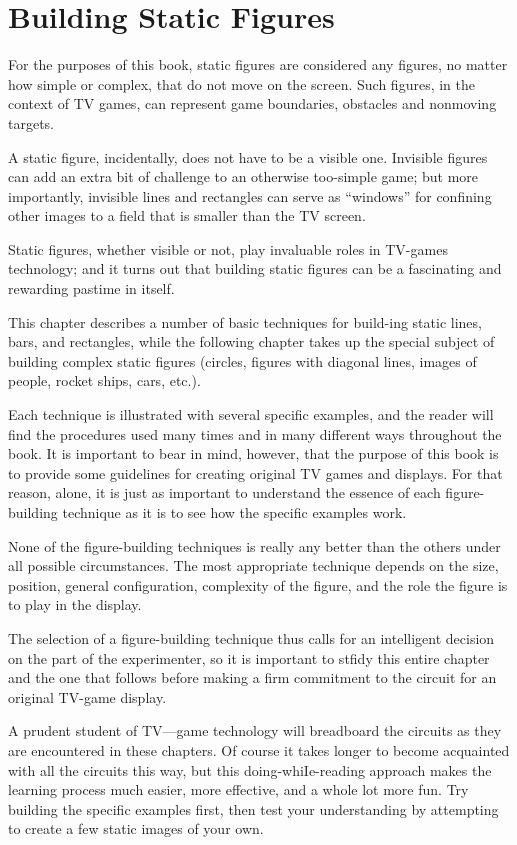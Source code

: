 \documentclass[11pt]{book}              %
\begin{document}
\chapter{Building Static Figures}

For the purposes of this book, static figures are considered any figures, no matter how simple or complex, that do not move on the screen. Such figures, in the context of TV games, can represent game boundaries, obstacles and nonmoving targets.

A static figure, incidentally, does not have to be a visible one. Invisible figures can add an extra bit of challenge to an otherwise too-simple game; but more importantly, invisible lines and rectangles can serve as “windows” for confining other images to a field that is smaller than the TV screen.

Static figures, whether visible or not, play invaluable roles in TV-games technology; and it turns out that building static figures can be a fascinating and rewarding pastime in itself.

This chapter describes a number of basic techniques for build-ing static lines, bars, and rectangles, while the following chapter takes up the special subject of building complex static figures (circles, figures with diagonal lines, images of people, rocket ships, cars, etc.).

Each technique is illustrated with several specific examples, and the reader will find the procedures used many times and in many different ways throughout the book. It is important to bear in mind, however, that the purpose of this book is to provide some guidelines for creating original TV games and displays. For that reason, alone, it is just as important to understand the essence of each figure-building technique as it is to see how the specific examples work.

None of the figure-building techniques is really any better than the others under all possible circumstances. The most appropriate technique depends on the size, position, general configuration, complexity of the figure, and the role the figure is to play in the display.

The selection of a figure-building technique thus calls for an intelligent decision on the part of the experimenter, so it is important to stfidy this entire chapter and the one that follows before making a firm commitment to the circuit for an original TV-game display.

A prudent student of TV—game technology will breadboard the circuits as they are encountered in these chapters. Of course it takes longer to become acquainted with all the circuits this way, but this doing-whiIe-reading approach makes the learning process much easier, more effective, and a whole lot more fun. Try building the specific examples first, then test your understanding by attempting to create a few static images of your own.
\end{document}
